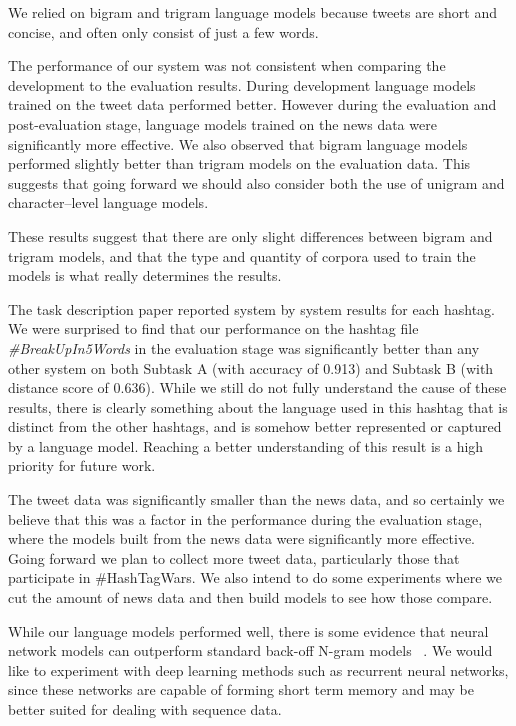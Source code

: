 \documentclass[11pt,a4paper]{article}
\begin{document}
We relied on bigram and trigram language models because 
tweets are short and concise, and often only consist of just
a few words. 

The performance of our system was not consistent when
comparing the development to the evaluation results.
During development language models trained on the
tweet data performed better.
However during the evaluation and post-evaluation stage, 
language models trained on the news data were 
significantly more effective. We also observed that
bigram language models performed slightly better than
trigram models on the evaluation data. This suggests
that going forward we should also consider both the use of
unigram and character--level language models. 

These results suggest that there are only 
slight differences between bigram and trigram models,
and that the type and quantity of corpora used to train the 
models is what really determines the results. 

The task description paper \cite{PotashRR17} 
reported system by system results for each hashtag. 
We were surprised to find that our 
performance on the hashtag file 
\textit{\#BreakUpIn5Words} in the evaluation 
stage was significantly 
better than any other  system on both Subtask A 
(with accuracy of 0.913) and Subtask B 
(with distance score of 0.636). While we still do not 
fully understand the cause of these results, there is clearly
something about the language used in this hashtag that
is distinct from the other hashtags, and is somehow better
represented or captured by a language model. Reaching a better
understanding of this  result is a high priority for future work. 

The tweet data was significantly smaller than the news data, and
so certainly we believe that this was a factor in the performance
during the evaluation stage, where the models built from the news
data were significantly more effective. Going forward we plan to
collect more tweet data, particularly those that participate in 
\#HashTagWars. We also intend to do some experiments where we 
cut the amount of news data and then build models to see how 
those compare. 

While our language models performed well, there
is some evidence that neural network models
can outperform 
standard back-off N-gram models ~\cite{mikolov2011extensions}. 
We would like to experiment with deep learning methods such 
as recurrent neural networks, since 
these networks are capable of 
forming short term memory and may be better suited for dealing 
with sequence data. 
\end{document}
